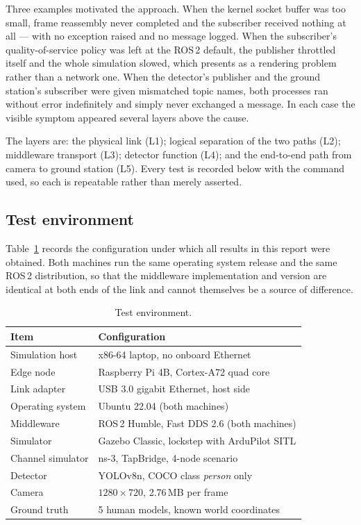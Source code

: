 Three examples motivated the approach. When the kernel socket buffer was too
small, frame reassembly never completed and the subscriber received nothing
at all --- with no exception raised and no message logged. When the
subscriber's quality-of-service policy was left at the ROS\,2 default, the
publisher throttled itself and the whole simulation slowed, which presents
as a rendering problem rather than a network one. When the detector's
publisher and the ground station's subscriber were given mismatched topic
names, both processes ran without error indefinitely and simply never
exchanged a message. In each case the visible symptom appeared several
layers above the cause.

The layers are: the physical link (L1); logical separation of the two paths
(L2); middleware transport (L3); detector function (L4); and the end-to-end
path from camera to ground station (L5). Every test is recorded below with
the command used, so each is repeatable rather than merely asserted.

\subsection{Test environment}
\label{sec:test-env}

Table~\ref{tab:test-env} records the configuration under which all results
in this report were obtained. Both machines run the same operating system
release and the same ROS\,2 distribution, so that the middleware
implementation and version are identical at both ends of the link and cannot
themselves be a source of difference.

\begin{table}[htbp]
\centering
\caption{Test environment.}
\label{tab:test-env}
\begin{tabular}{ll}
\toprule
Item & Configuration \\
\midrule
Simulation host    & x86-64 laptop, no onboard Ethernet \\
Edge node          & Raspberry Pi 4B, Cortex-A72 quad core \\
Link adapter       & USB 3.0 gigabit Ethernet, host side \\
Operating system   & Ubuntu 22.04 (both machines) \\
Middleware         & ROS\,2 Humble, Fast DDS 2.6 (both machines) \\
Simulator          & Gazebo Classic, lockstep with ArduPilot SITL \\
Channel simulator  & ns-3, TapBridge, 4-node scenario \\
Detector           & YOLOv8n, COCO class \emph{person} only \\
Camera             & $1280 \times 720$, 2.76\,MB per frame \\
Ground truth       & 5 human models, known world coordinates \\
\bottomrule
\end{tabular}
\end{table}

